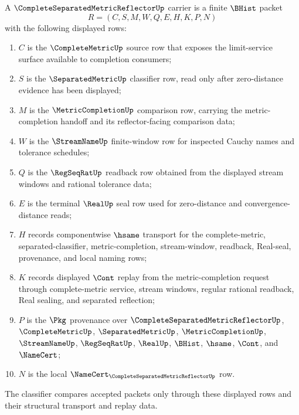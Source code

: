 \begin{definition}
\label{def:complete-separated-metric-reflector-carrier}
A $\CompleteSeparatedMetricReflectorUp$ carrier is a finite $\BHist$ packet
$$
R=(C,S,M,W,Q,E,H,K,P,N)
$$
with the following displayed rows:
\begin{enumerate}
\item $C$ is the $\CompleteMetricUp$ source row that exposes the limit-service surface available to completion consumers;
\item $S$ is the $\SeparatedMetricUp$ classifier row, read only after zero-distance evidence has been displayed;
\item $M$ is the $\MetricCompletionUp$ comparison row, carrying the metric-completion handoff and its reflector-facing comparison data;
\item $W$ is the $\StreamNameUp$ finite-window row for inspected Cauchy names and tolerance schedules;
\item $Q$ is the $\RegSeqRatUp$ readback row obtained from the displayed stream windows and rational tolerance data;
\item $E$ is the terminal $\RealUp$ seal row used for zero-distance and convergence-distance reads;
\item $H$ records componentwise $\hsame$ transport for the complete-metric, separated-classifier, metric-completion, stream-window, readback, Real-seal, provenance, and local naming rows;
\item $K$ records displayed $\Cont$ replay from the metric-completion request through complete-metric service, stream windows, regular rational readback, Real sealing, and separated reflection;
\item $P$ is the $\Pkg$ provenance over $\CompleteSeparatedMetricReflectorUp$, $\CompleteMetricUp$, $\SeparatedMetricUp$, $\MetricCompletionUp$, $\StreamNameUp$, $\RegSeqRatUp$, $\RealUp$, $\BHist$, $\hsame$, $\Cont$, and $\NameCert$;
\item $N$ is the local $\NameCert_{\CompleteSeparatedMetricReflectorUp}$ row.
\end{enumerate}
The classifier compares accepted packets only through these displayed rows and their structural transport and replay data.
\end{definition}

